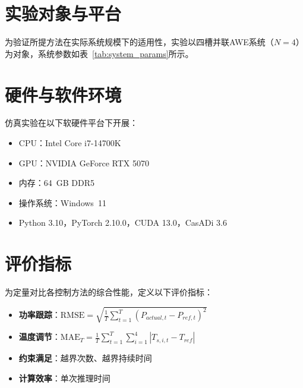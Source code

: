 \section{实验对象与平台}

为验证所提方法在实际系统规模下的适用性，实验以四槽并联AWE系统（$N=4$）为对象，系统参数如表~\ref{tab:system_params}所示。

\section{硬件与软件环境}

仿真实验在以下软硬件平台下开展：
\begin{itemize}
  \item CPU：Intel Core i7-14700K
  \item GPU：NVIDIA GeForce RTX 5070
  \item 内存：64~GB DDR5
  \item 操作系统：Windows~11
  \item Python 3.10，PyTorch 2.10.0，CUDA 13.0，CasADi 3.6
\end{itemize}

\section{评价指标}

为定量对比各控制方法的综合性能，定义以下评价指标：

\begin{itemize}
  \item \textbf{功率跟踪}：$\mathrm{RMSE} = \sqrt{\frac{1}{T}\sum_{t=1}^{T}(P_{actual,t} - P_{ref,t})^2}$
  \item \textbf{温度调节}：$\mathrm{MAE}_T = \frac{1}{T}\sum_{t=1}^{T}\sum_{i=1}^{4}|T_{s,i,t} - T_{ref}|$
  \item \textbf{约束满足}：越界次数、越界持续时间
  \item \textbf{计算效率}：单次推理时间
\end{itemize}

